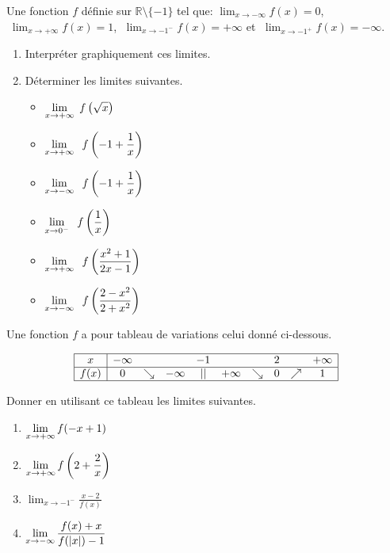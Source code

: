 \begin{exercice}
Une fonction $ f $ définie sur $\mathbb{R}\setminus\{-1\} $ tel que: $\displaystyle \lim_{x \to -\infty}f(x)=0 $,  $\; \displaystyle\lim_{x \to +\infty}f(x)=1$,  $\;\displaystyle \lim_{x \to -1^{-}}f(x)=+\infty $  et  $\; \displaystyle\lim_{x \to -1^{+}}f(x)=-\infty $. 
\begin{enumerate}
\item Interpréter graphiquement ces  limites.
\item Déterminer les limites suivantes.
\begin{itemize}
\item $\displaystyle \lim_{x \to+\infty}\; f\left(\sqrt{x}\right)$
\item $\displaystyle \lim_{x \to +\infty}\;\;f\left(-1+\frac{1}{x}\right)$
\item $\displaystyle \lim_{x \to -\infty}\;\;f\left(-1+\frac{1}{x}\right)$

\item $\displaystyle \lim_{x \to 0^{-}}\;\;f\left(\frac{1}{x}\right)$
\item $ \displaystyle\lim_{x \to +\infty}\;\;f\left(\frac{x^2+1}{2x-1}\right)$
\item $ \displaystyle\lim_{x \to -\infty}\;\;f\left(\frac{2-x^2}{2+x^2}\right)$
\end{itemize}

\end{enumerate}
\end{exercice}
\begin{exercice}
Une fonction $ f $ a pour tableau de variations celui donné ci-dessous.
\begin{center}
$$
\begin{array}{|c|ccccccccc|}
\hline
x & -\infty & & & -1 & & & 2 & & +\infty \\
\hline
f(x) & 0 & \searrow & -\infty & || & +\infty & \searrow & 0 & \nearrow & 1 \\
\hline
\end{array}
$$



\end{center}


 Donner en utilisant ce tableau les limites suivantes.
\begin{enumerate}
\item $ \displaystyle\lim_{x \to +\infty}f(-x+1)$\item $ \displaystyle\lim_{x \to +\infty}f\left(2+\frac{2}{x}\right)$ \item $\displaystyle \lim_{x \to -1^-}\frac{x-2}{f(x)}$  \item $\displaystyle \lim_{x \to -\infty}\frac{f(x)+x}{f(|x|)-1}$ 
\end{enumerate}
\end{exercice}


